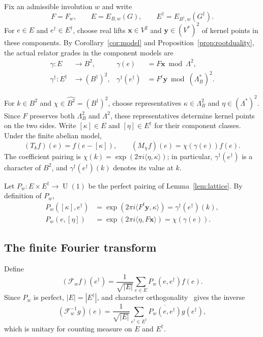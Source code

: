 \documentclass[11pt,a4paper,reqno]{amsart}
\theoremstyle{plain}
\theoremstyle{definition}
\theoremstyle{remark}
\numberwithin{equation}{section}
\newcommand{\UU}{\operatorname{U}}
\newcommand{\pair}[2]{\langle #1,#2\rangle}
\newcommand{\eexp}[1]{\exp(2\pi i #1)}
\begin{document}
Fix an admissible involution $w$ and write
\[
F=F_w,\qquad E=E_{B,w}(G),\qquad E^\dagger=E_{B^\dagger,w}(G^\dagger).
\]
For $e\in E$ and $e^\dagger\in E^\dagger$, choose real lifts $\mathbf x\in V^2$ and $\mathbf y\in(V^*)^2$ of kernel points in these components. By Corollary~\ref{cor:model} and Proposition~\ref{prop:rootduality}, the actual relator grades in the component models are
\[
\begin{aligned}
\gamma\colon E&\longrightarrow B^2, & \gamma(e)&=F\mathbf x\bmod\Lambda^2,\\
\gamma^\dagger\colon E^\dagger &\longrightarrow(B^\dagger)^2, & \gamma^\dagger(e^\dagger) &=F^t\mathbf y\bmod(\Lambda_B^*)^2.
\end{aligned}
\]

For $k\in B^2$ and $\chi\in\widehat{B^2}=(B^\dagger)^2$, choose representatives $\kappa\in\Lambda_B^2$ and $\eta\in(\Lambda^*)^2$. Since $F$ preserves both $\Lambda_B^2$ and $\Lambda^2$, these representatives determine kernel points on the two sides. Write $[\kappa]\in E$ and $[\eta]\in E^\dagger$ for their component classes. Under the finite abelian model,
\[
(T_kf)(e)=f(e-[\kappa]),\qquad (M_\chi f)(e)=\chi(\gamma(e))f(e).
\]
The coefficient pairing is $\chi(k)=\eexp{\pair{\eta}{\kappa}}$; in particular, $\gamma^\dagger(e^\dagger)$ is a character of $B^2$, and $\gamma^\dagger(e^\dagger)(k)$ denotes its value at $k$.

Let $P_w\colon E\times E^\dagger\to\UU(1)$ be the perfect pairing of Lemma~\ref{lem:lattice}. By definition of $P_w$,
\begin{align}
P_w([\kappa],e^\dagger) &=\eexp{\pair{F^t\mathbf y}{\kappa}} =\gamma^\dagger(e^\dagger)(k), \label{eq:ratio1}\\
P_w(e,[\eta]) &=\eexp{\pair{\eta}{F\mathbf x}} =\chi(\gamma(e)). \label{eq:ratio2}
\end{align}

\subsection{The finite Fourier transform}

Define
\begin{equation}\label{eq:transform}
(\mathcal F_w f)(e^\dagger)=\frac1{\sqrt{|E|}} \sum_{e\in E}P_w(e,e^\dagger)f(e).
\end{equation}
Since $P_w$ is perfect, $|E|=|E^\dagger|$, and character orthogonality~\cite{serre} gives the inverse
\begin{equation}\label{eq:inversefourier}
(\mathcal F_w^{-1}g)(e)=\frac1{\sqrt{|E|}} \sum_{e^\dagger\in E^\dagger}\overline{P_w(e,e^\dagger)}g(e^\dagger),
\end{equation}
which is unitary for counting measure on $E$ and $E^\dagger$.
\end{document}
